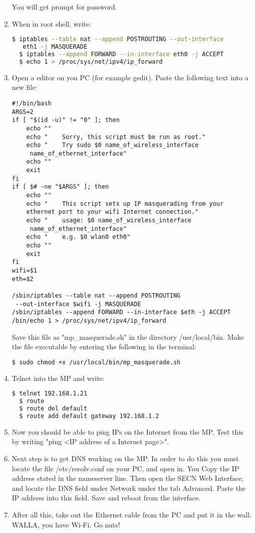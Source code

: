 \begin{enumerate}
You will get prompt for password. 
\item When in root shell, write: 
\noindent
\begin{lstlisting}[language=bash]
  $ iptables --table nat --append POSTROUTING --out-interface
   eth1 -j MASQUERADE
  $ iptables --append FORWARD --in-interface eth0 -j ACCEPT
  $ echo 1 > /proc/sys/net/ipv4/ip_forward
\end{lstlisting}
\item Open a editor on you PC (for example gedit). Paste the following text into a new file: 
\begin{framed}
\begin{verbatim}
#!/bin/bash
ARGS=2
if [ "$(id -u)" != "0" ]; then
    echo ""
    echo "    Sorry, this script must be run as root."
    echo "    Try sudo $0 name_of_wireless_interface
     name_of_ethernet_interface"
    echo ""
    exit
fi
if [ $# -ne "$ARGS" ]; then 
    echo ""
    echo "    This script sets up IP masquerading from your 
    ethernet port to your wifi Internet connection."
    echo "    usage: $0 name_of_wireless_interface
     name_of_ethernet_interface"
    echo "    e.g. $0 wlan0 eth0"
    echo ""
    exit
fi
wifi=$1
eth=$2

/sbin/iptables --table nat --append POSTROUTING
 --out-interface $wifi -j MASQUERADE
/sbin/iptables --append FORWARD --in-interface $eth -j ACCEPT
/bin/echo 1 > /proc/sys/net/ipv4/ip_forward
\end{verbatim}
\end{framed}

Save this file as "mp_masquerade.sh" in the directory /usr/local/bin. Make the file executable by entering the following in the terminal:
\noindent
\begin{lstlisting}[language=bash]
  $ sudo chmod +x /usr/local/bin/mp_masquerade.sh
\end{lstlisting}
\item Telnet into the MP and write:
\noindent
\begin{lstlisting}[language=bash]
  $ telnet 192.168.1.21
  $ route 
  $ route del default
  $ route add default gateway 192.168.1.2
\end{lstlisting}
\item Now you should be able to ping IPs on the Internet from the MP. Test this by writing "ping <IP address of a Internet page>". 
\item Next step is to get DNS working on the MP. In order to do this you must locate the file /etc/resolv.conf on your PC, and open in. You Copy the IP address stated in the nameserver line. Then open the SECN Web Interface, and locate the DNS field under Network under the tab Advanced. Paste the IP address into this field. Save and reboot from the interface. 
\item After all this, take out the Ethernet cable from the PC and put it in the wall. WALLA, you have Wi-Fi. Go nuts!
\end{enumerate}